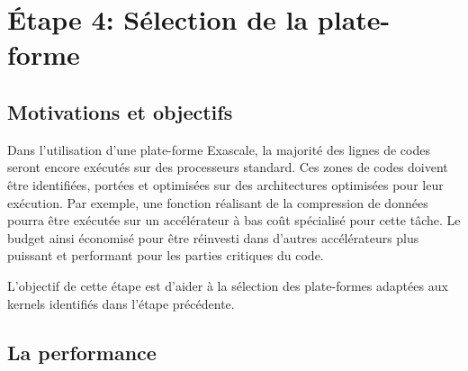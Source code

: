 \section{Étape 4: Sélection de la plate-forme}


\subsection{Motivations et objectifs}


Dans l'utilisation d'une plate-forme Exascale, la majorité des lignes de codes seront encore exécutés sur des processeurs standard. Ces zones de codes doivent être identifiées, portées et optimisées sur des architectures optimisées pour leur exécution. Par exemple, une fonction réalisant de la compression de données pourra être exécutée sur un accélérateur à bas coût spécialisé pour cette tâche. Le budget ainsi économisé pour être réinvesti dans d'autres accélérateurs plus puissant et performant pour les parties critiques du code. 

L'objectif de cette étape est d'aider à la sélection des plate-formes adaptées aux kernels identifiés dans l'étape précédente.



\subsection{La performance}

